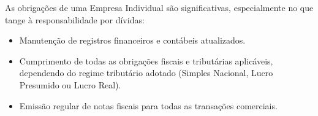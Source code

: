 As obrigações de uma Empresa Individual são significativas, especialmente no que tange à responsabilidade por dívidas:
\begin{itemize}
    \item Manutenção de registros financeiros e contábeis atualizados.
    \item Cumprimento de todas as obrigações fiscais e tributárias aplicáveis, dependendo do regime tributário adotado (Simples Nacional, Lucro Presumido ou Lucro Real).
    \item Emissão regular de notas fiscais para todas as transações comerciais.
\end{itemize}
